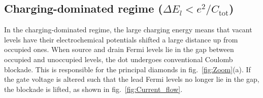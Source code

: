\documentclass[a4paper,11pt]{article}
\begin{document}
    \subsection{Charging-dominated regime ($\Delta E_l < e^2/C_\mathrm{tot}$)}\label{sec:Charging-dominated}

    In the charging-dominated regime, the large charging energy means that vacant levels have their electrochemical potentials shifted a large distance up from occupied ones. When source and drain Fermi levels lie in the gap between occupied and unoccupied levels, the dot undergoes conventional Coulomb blockade. This is responsible for the principal diamonds in fig.~\ref{fig:Zoom}(a). If the gate voltage is altered such that the lead Fermi levels no longer lie in the gap, the blockade is lifted, as shown in fig.~\ref{fig:Current_flow}.
\end{document}
